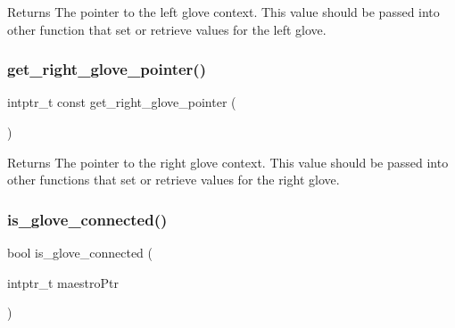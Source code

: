 \begin{DoxyReturn}{Returns}
The pointer to the left glove context. This value should be passed into other function that set or retrieve values for the left glove. 
\end{DoxyReturn}
\mbox{\label{group__glove_management_ga9b8fd9d91aeac3f8da50f7a7eba0c32b}} 
\subsubsection{\texorpdfstring{get\+\_\+right\+\_\+glove\+\_\+pointer()}{get\_right\_glove\_pointer()}}
{\footnotesize\ttfamily intptr\+\_\+t const get\+\_\+right\+\_\+glove\+\_\+pointer (\begin{DoxyParamCaption}{ }\end{DoxyParamCaption})}

\begin{DoxyReturn}{Returns}
The pointer to the right glove context. This value should be passed into other functions that set or retrieve values for the right glove. 
\end{DoxyReturn}
\mbox{\label{group__glove_management_ga85666868951331c5266df7559abeefbc}} 
\subsubsection{\texorpdfstring{is\+\_\+glove\+\_\+connected()}{is\_glove\_connected()}}
{\footnotesize\ttfamily bool is\+\_\+glove\+\_\+connected (\begin{DoxyParamCaption}\item[{intptr\+\_\+t}]{maestro\+Ptr }\end{DoxyParamCaption})}



